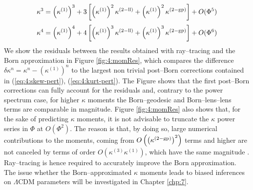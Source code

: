 \begin{equation}
\label{eq:4:skew-pert}
\kappa^3 = \left(\kappa^{(1)}\right)^3 + 3\left[\left(\kappa^{(1)}\right)^2\kappa^{(2-{\rm ll})} + \left(\kappa^{(1)}\right)^2\kappa^{(2-{\rm gp})} \right] + O(\Phi^5)
\end{equation}
%
\begin{equation}
\label{eq:4:kurt-pert}
\kappa^4 = \left(\kappa^{(1)}\right)^4 + 4\left[\left(\kappa^{(1)}\right)^3\kappa^{(2-{\rm ll})} + \left(\kappa^{(1)}\right)^3\kappa^{(2-{\rm gp})} \right] + O(\Phi^6)
\end{equation}
%
We show the residuals between the results obtained with ray--tracing and the Born approximation in Figure \ref{fig:4:momRes}, which compares the difference $\delta{\kappa}^n=\kappa^n - \left(\kappa^{(1)}\right)^n$ to the largest non trivial post--Born corrections contained in (\ref{eq:4:skew-pert}), (\ref{eq:4:kurt-pert}). The Figure shows that the first post--Born corrections can fully account for the residuals and, contrary to the power spectrum case, for higher $\kappa$ moments the Born--geodesic and Born--lens--lens terms are comparable in magnitude. Figure \ref{fig:4:momRes} also shows that, for the sake of predicting $\kappa$ moments, it is not advisable to truncate the $\kappa$ power series in $\Phi$ at $O(\Phi^2)$. The reason is that, by doing so, large numerical contributions to the moments, coming from $O\left(\left(\kappa^{(2-{\rm gp})}\right)^2\right)$ terms and higher are not canceled by terms of order $O\left(\kappa^{(3)}\kappa^{(1)}\right)$, which have the same magnitude \citep{HirataKrause}. Ray--tracing is hence required to accurately improve the Born approximation. The issue whether the Born--approximated $\kappa$ moments leads to biased inferences on $\Lambda$CDM parameters will be investigated in Chapter \ref{chp:7}. 


